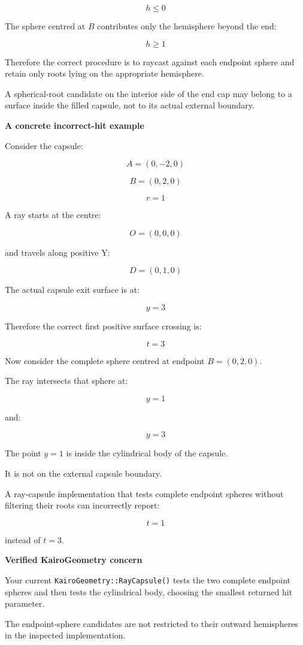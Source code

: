 \[
\boxed{h\le0}
\]

The sphere centred at \(B\) contributes only the hemisphere beyond the end:

\[
\boxed{h\ge1}
\]

Therefore the correct procedure is to raycast against each endpoint sphere and retain only roots lying on the appropriate hemisphere.

A spherical-root candidate on the interior side of the end cap may belong to a surface inside the filled capsule, not to its actual external boundary.

\textbf{A concrete incorrect-hit example}

Consider the capsule:

\[
A=(0,-2,0)
\]

\[
B=(0,2,0)
\]

\[
r=1
\]

A ray starts at the centre:

\[
O=(0,0,0)
\]

and travels along positive Y:

\[
D=(0,1,0)
\]

The actual capsule exit surface is at:

\[
y=3
\]

Therefore the correct first positive surface crossing is:

\[
\boxed{t=3}
\]

Now consider the complete sphere centred at endpoint \(B=(0,2,0)\).

The ray intersects that sphere at:

\[
y=1
\]

and:

\[
y=3
\]

The point \(y=1\) is inside the cylindrical body of the capsule.

It is not on the external capsule boundary.

A ray-capsule implementation that tests complete endpoint spheres without filtering their roots can incorrectly report:

\[
t=1
\]

instead of \(t=3\).

\textbf{Verified KairoGeometry concern}

Your current \texttt{KairoGeometry::RayCapsule()} tests the two complete endpoint spheres and then tests the cylindrical body, choosing the smallest returned hit parameter.

The endpoint-sphere candidates are not restricted to their outward hemispheres in the inspected implementation.

